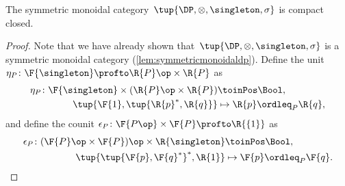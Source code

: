 \begin{lemma}\label{lem:DP-compact-closed}
    The symmetric monoidal category~$\tup{\DP,\otimes,\singleton,\sigma}$ is compact closed.
\end{lemma}
\begin{proof}
    Note that we have already shown that~$\tup{\DP,\otimes,\singleton,\sigma}$ is a symmetric monoidal category (\cref{lem:symmetricmonoidaldp}). Define the unit~$\eta_P\colon \F{\singleton} \profto \R{P}\op \times \R{P} $ as
    \begin{equation}
        \label{eq:unit_morphism}
        \begin{aligned}
            \eta_P \colon \F{\singleton} \times (\R{P}\op \times \R{P}) & \toinPos \Bool, \\
            \tup{\F{1},\tup{\R{p}^*,\R{q}}} & \mapsto \R{p} \ordleq_P \R{q},
        \end{aligned}
    \end{equation}
    and define the counit $\epsilon_P\colon \F{P\op} \times \F{P} \profto \R{\{1\}} $ as
    \begin{equation}
        \begin{aligned}
            \epsilon_P \colon (\F{P}\op \times \F{P})\op \times \R{\singleton} & \toinPos \Bool,  \\
            \tup{\tup{\F{p},\F{q}^*}^*, \R{1}} & \mapsto \F{p} \ordleq_P \F{q}.
        \end{aligned}
    \end{equation}


\end{proof}
